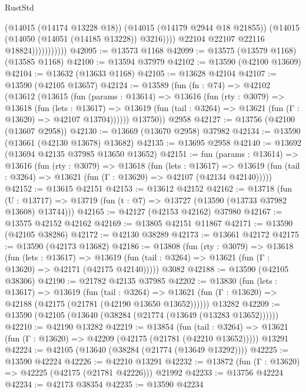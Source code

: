 \begin{lexlean}{RustStd}
\begin{coremodule}
                              (@14015 (@14174 @13228 @18))
                              (@14015 (@14179 @2944 @18 @21855))
                              (@14015 (@14050 (@14051 (@14185 @13228)) @3216))))
                          @22104
                          @22107
                          @22116
                          @18824)))))))))))
@42095 := @13573 @1168
@42099 := @13575 (@13579 @1168) (@13585 @1168)
@42100 := @13594 @37979
@42102 := @13590 (@42100 @13609)
@42104 := @13632 (@13633 @1168)
@42105 := @13628 @42104
@42107 := @13590 (@42105 @13657)
@42124 := @13589
    (fun (fn : @74) =>
    @42102
      (@13612
        (@13615
          (fun (params : @13614) =>
          @13616
            (fun (rty : @3079) =>
            @13618
              (fun (lets : @13617) =>
              @13619 (fun (tail : @3264) => @13621 (fun (Γ : @13620) => @42107 @13704))))))
        @13750))
    @2958
@42127 := @13756 (@42100 (@13607 @2958))
@42130 := @13669 (@13670 @2958) @37982
@42134 := @13590 (@13661 (@42130 @13678) @13682)
@42135 := @13695 @2958
@42140 := @13692 (@13694 @42135 @37985 @13650 @13652)
@42151 := fun (params : @13614) =>
  @13616
    (fun (rty : @3079) =>
    @13618
      (fun (lets : @13617) =>
      @13619 (fun (tail : @3264) => @13621 (fun (Γ : @13620) => @42107 (@42134 @42140)))))
@42152 := @13615 @42151
@42153 := @13612 @42152
@42162 := @13718
    (fun (U : @13717) => @13719 (fun (t : @7) => @13727 (@13590 (@13733 @37982 @13608) @13744)))
@42165 := @42127 (@42153 @42162) @37980
@42167 := @13575 @42152 @42162
@42169 := @13805 @42151 @11867
@42171 := @13590 (@42105 @38286)
@42172 := @42130 @38289
@42173 := @13661 @42172
@42175 := @13590 (@42173 @13682)
@42186 := @13808
    (fun (rty : @3079) =>
    @13618
      (fun (lets : @13617) =>
      @13619 (fun (tail : @3264) => @13621 (fun (Γ : @13620) => @42171 (@42175 @42140)))))
    @3082
@42188 := @13590 (@42105 @38306)
@42190 := @21782 @42135 @37985
@42202 := @13830
    (fun (lets : @13617) =>
    @13619
      (fun (tail : @3264) =>
      @13621 (fun (Γ : @13620) => @42188 (@42175 (@21781 (@42190 @13650 @13652))))))
    @13282
@42209 := @13590 (@42105 (@13640 (@38284 (@21774 (@13649 (@13283 @13652))))))
@42210 := @42190 @13282
@42219 := @13854
    (fun (tail : @3264) => @13621 (fun (Γ : @13620) => @42209 (@42175 (@21781 (@42210 @13652)))))
    @13291
@42224 := @42105 (@13640 (@38284 (@21774 (@13649 @13292))))
@42225 := @13590 @42224
@42226 := @42210 @13291
@42232 := @13872 (fun (Γ : @13620) => @42225 (@42175 (@21781 @42226))) @21992
@42233 := @13756 @42224
@42234 := @42173 @38354
@42235 := @13590 @42234

\end{coremodule}
\end{lexlean}
